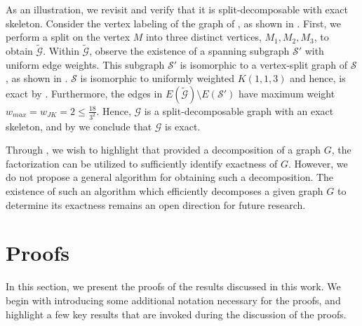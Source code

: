 \documentclass[a4paper,fleqn]{cas-sc}
\newcommand{\1}{\mathbf{1}}
\begin{document}
As an illustration, we revisit  and verify that it is split-decomposable with exact skeleton. Consider the vertex labeling of the graph of , as shown in . First, we perform a split on the vertex $M$ into three distinct vertices, $M_1, M_2, M_3$, to obtain $\mathcal{\widetilde{G}}$. Within $\mathcal{\widetilde{G}}$, observe the existence of a spanning subgraph $\mathcal{S'}$ with uniform edge weights. This subgraph $\mathcal{S'}$ is isomorphic to a vertex-split graph of $\mathcal{S}$, as shown in . $\mathcal{S}$ is isomorphic to uniformly weighted $K(1,1,3)$ and hence, is exact by . Furthermore, the edges in $E(\mathcal{\widetilde{G}}) \setminus E(\mathcal{S'})$ have maximum weight $w_{max} = w_{JK} = 2 \leq \frac{18}{3^2}$. Hence, $\mathcal{G}$ is a split-decomposable graph with an exact skeleton, and by  we conclude that $\mathcal{G}$ is exact.

\begin{remark}
Through , we wish to highlight that provided a decomposition of a graph $G$, the factorization can be utilized to sufficiently identify exactness of $G$. However, we do not propose a general algorithm for obtaining such a decomposition. The existence of such an algorithm which efficiently decomposes a given graph $G$ to determine its exactness remains an open direction for future research. %
\end{remark}

\section{Proofs}\label{sec5}
In this section, we present the proofs of the results discussed in this work. We begin with introducing some additional notation necessary for the proofs, and highlight a few key results that are invoked during the discussion of the proofs. 
\end{document}
